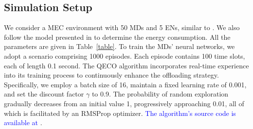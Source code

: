\documentclass[10pt, journal,letterpaper]{IEEEtran}
\begin{document}
\subsection{Simulation Setup}
We consider a MEC environment with 50 MDs and 5 ENs, similar to \cite{9253665}. We also follow the model presented in \cite{zhou2021deep} to determine the energy consumption. All the parameters are given in Table~\ref{table}. To train the MDs' neural networks, we adopt a scenario comprising 1000 episodes. Each episode contains 100 time slots, each of length 0.1 second. The QECO algorithm incorporates real-time experience into its training process to continuously enhance the offloading strategy. Specifically, we employ a batch size of 16, maintain a fixed learning rate of 0.001, and set the discount factor $\gamma$ to 0.9. The probability of random exploration gradually decreases from an initial value 1, progressively approaching 0.01, all of which is facilitated by an RMSProp optimizer. \textcolor{blue}{The algorithm's source code is available at \cite{QECO}}.
	
	
\end{document}
